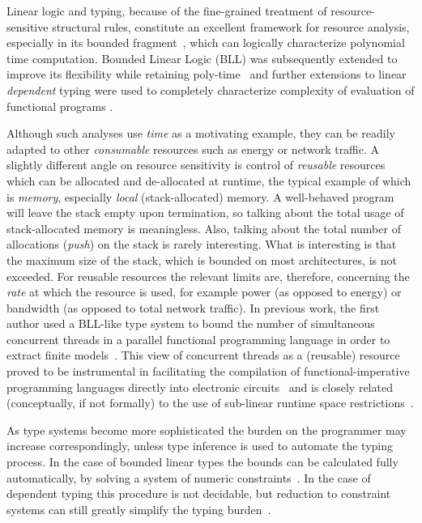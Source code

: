 \documentclass{article}
\begin{document}
Linear logic and typing, because of the fine-grained treatment of resource-sensitive structural rules, constitute an excellent framework for resource analysis, especially in its bounded fragment~\cite{girard1992bounded}, which can logically characterize polynomial time computation. Bounded Linear Logic (BLL) was subsequently extended to improve its flexibility while retaining poly-time~\cite{DBLP:conf/tlca/LagoH09} and further extensions to linear \emph{dependent} typing were used to completely characterize complexity of evaluation of functional programs \cite{DBLP:journals/corr/abs-1104-0193}. 

Although such analyses use \emph{time} as a motivating example, they can be readily adapted to other \emph{consumable} resources such as energy or network traffic. A slightly different angle on resource sensitivity is control of \emph{reusable} resources which can be allocated and de-allocated at runtime, the typical example of which is \emph{memory}, especially \emph{local} (stack-allocated) memory. A well-behaved program will leave the stack empty upon termination, so talking about the total usage of stack-allocated memory is meaningless. Also, talking about the total number of allocations (\emph{push}) on the stack is rarely interesting. What is interesting is that the maximum size of the stack, which is bounded on most architectures, is not exceeded. For reusable resources the relevant limits are, therefore, concerning the \emph{rate} at which the resource is used, for example power (as opposed to energy) or bandwidth (as opposed to total network traffic). In previous work, the first author used a BLL-like type system to bound the number of simultaneous concurrent threads in a parallel functional programming language in order to extract finite models~\cite{DBLP:journals/tcs/GhicaMO06}. This view of concurrent threads as a (reusable) resource proved to be instrumental in facilitating the compilation of functional-imperative programming languages directly into electronic circuits~\cite{DBLP:conf/popl/Ghica07} and is closely related (conceptually, if not formally) to the use of sub-linear runtime space restrictions~\cite{DBLP:conf/aplas/LagoS10}. 

As type systems become more sophisticated the burden on the programmer may increase correspondingly, unless type inference is used to automate the typing process. In the case of bounded linear types the bounds can be calculated fully automatically, by solving a system of numeric constraints~\cite{DBLP:conf/popl/GhicaS11}. In the case of dependent typing this procedure is not decidable, but reduction to constraint systems can still greatly simplify the typing burden~\cite{DBLP:conf/popl/LagoP13}. 
\end{document}
